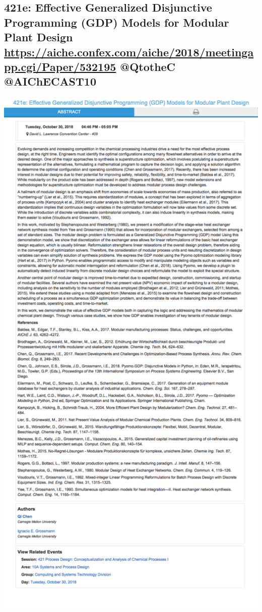 \documentclass[11pt]{article}
\begin{document}
\subsection{421e: Effective Generalized Disjunctive Programming (GDP) Models for Modular Plant Design \url{https://aiche.confex.com/aiche/2018/meetingapp.cgi/Paper/532195} @QtotheC @AIChECAST10}
\label{sec:orgfdde228}
\begin{center}
\includegraphics[width=.9\linewidth]{./532195.png}
\end{center}
\end{document}
